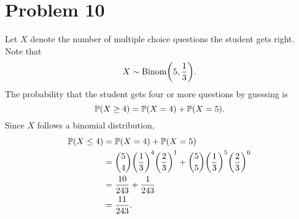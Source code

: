 \documentclass[12pt]{extarticle}
\begin{document}
\section*{Problem 10}
Let $X$ denote the number of multiple choice questions the student gets right. Note that
\[
	X \sim \text{Binom}\qty(5,\frac{1}{3})
.\]
The probability that the student gets four or more questions by guessing is
\[
	\mathbb{P}\qty(X \geq 4) = \mathbb{P}\qty(X = 4) + \mathbb{P}\qty(X = 5)
.\]
Since $X$ follows a binomial distribution,
\begin{align*}
	\mathbb{P}\qty(X \leq 4) &= \mathbb{P}\qty(X = 4) + \mathbb{P}\qty(X = 5) \\
									&= \binom{5}{4} \qty(\frac{1}{3})^4 \qty(\frac{2}{3})^1 + \binom{5}{5} \qty(\frac{1}{3})^5 \qty(\frac{2}{3})^0 \\
									&= \frac{10}{243} + \frac{1}{243} \\
									&= \frac{11}{243}
.\end{align*}
\end{document}

